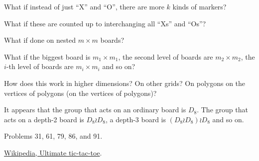 \documentclass{article}
\begin{document}
\begin{related}
  \item What if instead of just ``X'' and ``O'', there are more $k$ kinds of
    markers?
  \item What if these are counted up to interchanging all ``Xs'' and ``Os''?
  \item What if done on nested $m \times m$ boards?
  \item What if the biggest board is $m_1 \times m_1$, the second level of
    boards are $m_2 \times m_2$, the $i$-th level of boards are
    $m_i \times m_i$ and so on?
  \item How does this work in higher dimensions? On other grids?
  On polygons on the vertices of polygons (on the vertices of polygons)?
\end{related}

\begin{note}
  It appears that the group that acts on an ordinary board is $D_8$.
  The group that acts on a depth-2 board is $D_8 \wr D_8$, a depth-3 board is
  $(D_8 \wr D_8) \wr D_8$ and so on.
\end{note}
\begin{references}
  \item Problems 31, 61, 79, 86, and 91.
  \item \href{https://en.wikipedia.org/wiki/Ultimate_tic-tac-toe}{Wikipedia, Ultimate tic-tac-toe}.
\end{references}
\end{document}
